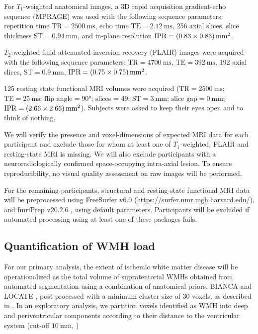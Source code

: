 For $T_1$-weighted anatomical images, a 3D rapid acquisition gradient-echo sequence (MPRAGE) was used with the following sequence parameters: repetition time $\text{TR} = \qty{2500}{\ms}$, echo time $\text{TE} = \qty{2.12}{\ms}$, 256 axial slices, slice thickness $\text{ST} = \qty{0.94}{\mm}$, and in-plane resolution  $\text{IPR} = \qtyproduct[product-units = bracket-power]{0.83 x 0.83}{\mm}$.

$T_2$-weighted fluid attenuated inversion recovery (FLAIR) images were acquired with the following sequence parameters: $\text{TR} = \qty{4700}{\ms}$, $\text{TE} = \qty{392}{\ms}$, \num{192} axial slices, $\text{ST} = \qty{0.9}{\mm}$, $\text{IPR} = \qtyproduct[product-units = bracket-power]{0.75 x 0.75}{\mm}$.

\num{125} resting state functional MRI volumes were acquired ($\text{TR} = \qty{2500}{\ms}$; $\text{TE} = \qty{25}{\ms}$; $\text{flip angle} = \ang[]{90}$; slices = \num{49}; $\text{ST} = \qty{3}{\mm}$; $\text{slice gap} = \qty{0}{\mm}$; $\text{IPR} = \qtyproduct[product-units = bracket-power]{2.66 x 2.66}{\mm}$).
Subjects were asked to keep their eyes open and to think of nothing.

We will verify the presence and voxel-dimensions of expected MRI data for each participant and exclude those for whom at least one of $T_1$-weighted, FLAIR and resting-state MRI is missing. We will also exclude participants with a neuroradiologically confirmed space-occupying intra-axial lesion.
To ensure reproducibility, no visual quality assessment on raw images will be performed.

For the remaining participants, structural and resting-state functional MRI data will be preprocessed using FreeSurfer v6.0 (\url{https://surfer.nmr.mgh.harvard.edu/}), and fmriPrep v20.2.6 \citep{Esteban2019-sx}, using default parameters. Participants will be excluded if automated processing using at least one of these packages fails.

\subsection{Quantification of WMH load}
For our primary analysis, the extent of ischemic white matter disease will be operationalized as the total volume of supratentorial WMHs obtained from automated segmentation using a combination of anatomical priors, BIANCA \citep{Griffanti2016-dt} and LOCATE \citep{Sundaresan2019-ww}, post-processed with a minimum cluster size of \num{30} voxels, as described in \citep{Schlemm2022-he}.
In an exploratory analysis, we partition voxels identified as WMH into deep and periventricular components according to their distance to the ventricular system (cut-off $\qty{10}{\mm}$, \citep{Griffanti2018-oa})

